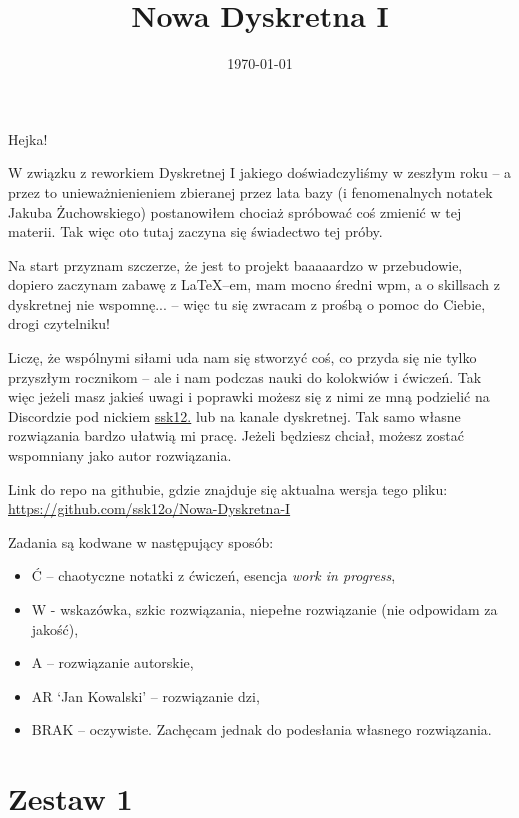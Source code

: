 \documentclass{mwbk}
\begin{document}
\title{Nowa Dyskretna I}
\date{\today}
\maketitle

Hejka!

W związku z reworkiem Dyskretnej I jakiego doświadczyliśmy w zeszłym
roku -- a przez to unieważnienieniem zbieranej przez lata bazy (i
fenomenalnych notatek Jakuba Żuchowskiego) postanowiłem chociaż
spróbować coś zmienić w tej materii. Tak więc oto tutaj zaczyna się
świadectwo tej próby. \newline


Na start przyznam szczerze, że jest to projekt baaaaardzo w przebudowie,
dopiero zaczynam zabawę z \LaTeX --em, mam mocno średni wpm, a o skillsach
z dyskretnej nie wspomnę... -- więc tu się zwracam z prośbą o pomoc do
Ciebie, drogi czytelniku!\newline

Liczę, że wspólnymi siłami uda nam się stworzyć coś, co przyda się
nie tylko przyszłym rocznikom -- ale i nam podczas nauki do kolokwiów
i ćwiczeń. Tak więc jeżeli masz jakieś uwagi i poprawki możesz
się z nimi ze mną podzielić na Discordzie pod nickiem \url{ssk12.}
lub na kanale dyskretnej. Tak samo własne rozwiązania bardzo ułatwią mi pracę.
Jeżeli będziesz chciał, możesz zostać wspomniany jako autor rozwiązania.\newline

Link do repo na githubie, gdzie znajduje się aktualna wersja tego pliku:
\url{https://github.com/ssk12o/Nowa-Dyskretna-I} \newline

Zadania są kodwane w następujący sposób:
\begin{itemize}
    \item Ć -- chaotyczne notatki z ćwiczeń, esencja \textit{work in progress},
    \item W - wskazówka, szkic rozwiązania, niepełne rozwiązanie (nie odpowidam za jakość),
    \item A -- rozwiązanie autorskie,
    \item AR `Jan Kowalski' -- rozwiązanie dzi,
    \item BRAK -- oczywiste. Zachęcam jednak do podesłania własnego rozwiązania.
\end{itemize}

\tableofcontents

\chapter{Zestaw 1}
\end{document}
